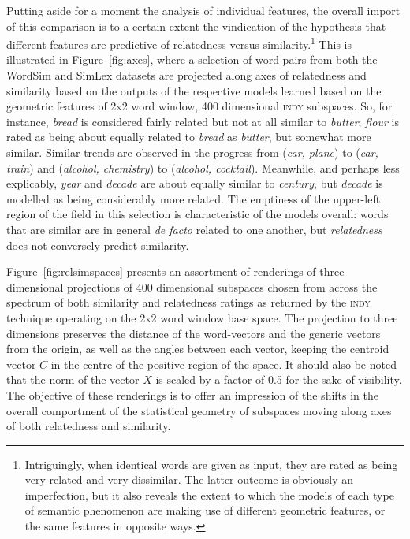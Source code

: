 Putting aside for a moment the analysis of individual features, the overall import of this comparison is to a certain extent the vindication of the hypothesis that different features are predictive of relatedness versus similarity.\footnote{Intriguingly, when identical words are given as input, they are rated as being very related and very dissimilar.  The latter outcome is obviously an imperfection, but it also reveals the extent to which the models of each type of semantic phenomenon are making use of different geometric features, or the same features in opposite ways.}  This is illustrated in Figure~\ref{fig:axes}, where a selection of word pairs from both the WordSim and SimLex datasets are projected along axes of relatedness and similarity based on the outputs of the respective models learned based on the geometric features of 2x2 word window, 400 dimensional \textsc{indy} subspaces.  So, for instance, \emph{bread} is considered fairly related but not at all similar to \emph{butter}; \emph{flour} is rated as being about equally related to \emph{bread} as \emph{butter}, but somewhat more similar.  Similar trends are observed in the progress from (\emph{car, plane}) to (\emph{car, train}) and (\emph{alcohol, chemistry}) to (\emph{alcohol, cocktail}).  Meanwhile, and perhaps less explicably, \emph{year} and \emph{decade} are about equally similar to \emph{century}, but \emph{decade} is modelled as being considerably more related.  The emptiness of the upper-left region of the field in this selection is characteristic of the models overall: words that are similar are in general \emph{de facto} related to one another, but \emph{relatedness} does not conversely predict similarity.

Figure~\ref{fig:relsimspaces} presents an assortment of renderings of three dimensional projections of 400 dimensional subspaces chosen from across the spectrum of both similarity and relatedness ratings as returned by the \textsc{indy} technique operating on the 2x2 word window base space.  The projection to three dimensions preserves the distance of the word-vectors and the generic vectors from the origin, as well as the angles between each vector, keeping the centroid vector $C$ in the centre of the positive region of the space.  It should also be noted that the norm of the vector $X$ is scaled by a factor of 0.5 for the sake of visibility.  The objective of these renderings is to offer an impression of the shifts in the overall comportment of the statistical geometry of subspaces moving along axes of both relatedness and similarity.

